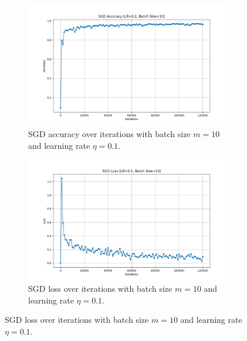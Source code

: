 \documentclass{article}
\begin{document}
\begin{figure}[H]
    \centering
    \begin{subfigure}[b]{0.49\textwidth}
        \centering
        \includegraphics[width=\textwidth]{plots/part1_sgd_accuracy.png}
        \caption{SGD accuracy over iterations with batch size $m=10$ and learning rate $\eta=0.1$.}
        \label{fig:sgd_accuracy}
    \end{subfigure}
    \hfill
    \begin{subfigure}[b]{0.49\textwidth}
        \centering
        \includegraphics[width=\textwidth]{plots/part1_sgd_loss.png}
        \caption{SGD loss over iterations with batch size $m=10$ and learning rate $\eta=0.1$.}
        \label{fig:sgd_loss}
    \end{subfigure}
\end{figure}

\end{document}
